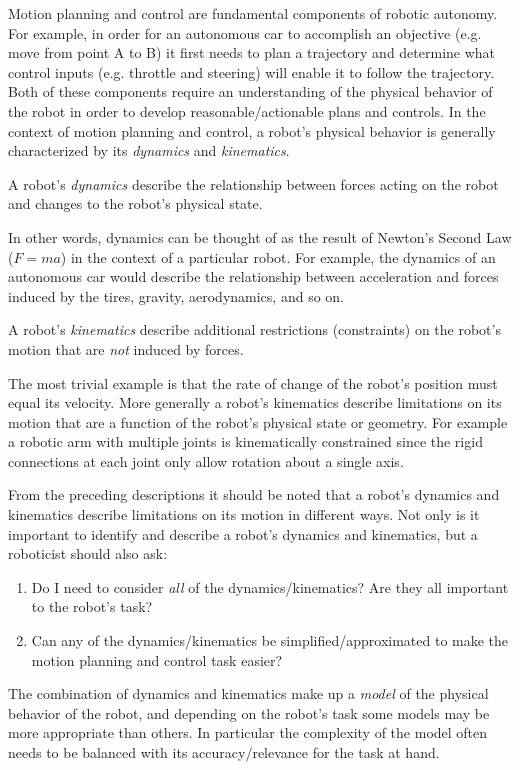 Motion planning and control are fundamental components of robotic autonomy\cite{SiegwartNourbakhshEtAl2011}. For example, in order for an autonomous car to accomplish an objective (e.g. move from point A to B) it first needs to plan a trajectory and determine what control inputs (e.g. throttle and steering) will enable it to follow the trajectory. Both of these components require an understanding of the physical behavior of the robot in order to develop reasonable/actionable plans and controls. In the context of motion planning and control, a robot's physical behavior is generally characterized by its \textit{dynamics} and \textit{kinematics}.

\begin{definition}[Dynamics]
A robot's \textit{dynamics} describe the relationship between forces acting on the robot and changes to the robot's physical state.
\end{definition}
In other words, dynamics can be thought of as the result of Newton's Second Law ($F=ma$) in the context of a particular robot. For example, the dynamics of an autonomous car would describe the relationship between acceleration and forces induced by the tires, gravity, aerodynamics, and so on.

\begin{definition}[Kinematics]
A robot's \textit{kinematics} describe additional restrictions (constraints) on the robot's motion that are \textit{not} induced by forces.
\end{definition}

The most trivial example is that the rate of change of the robot's position must equal its velocity. More generally a robot's kinematics describe limitations on its motion that are a function of the robot's physical state or geometry. For example a robotic arm with multiple joints is kinematically constrained since the rigid connections at each joint only allow rotation about a single axis.

From the preceding descriptions it should be noted that a robot's dynamics and kinematics describe limitations on its motion in different ways.
Not only is it important to identify and describe a robot's dynamics and kinematics, but a roboticist should also ask:
\begin{enumerate}
    \item Do I need to consider \textit{all} of the dynamics/kinematics? Are they all important to the robot's task?
    \item Can any of the dynamics/kinematics be simplified/approximated to make the motion planning and control task easier? 
\end{enumerate}
The combination of dynamics and kinematics make up a \textit{model} of the physical behavior of the robot, and depending on the robot's task some models may be more appropriate than others. In particular the complexity of the model often needs to be balanced with its accuracy/relevance for the task at hand. 

